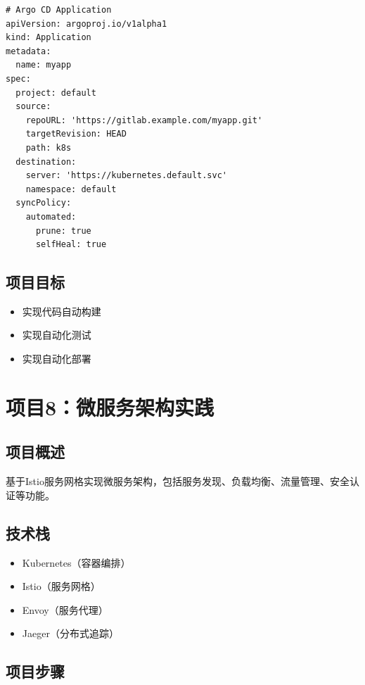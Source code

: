 \documentclass[12pt,UTF8]{ctexbook}
\begin{document}
\begin{lstlisting}
# Argo CD Application
apiVersion: argoproj.io/v1alpha1
kind: Application
metadata:
  name: myapp
spec:
  project: default
  source:
    repoURL: 'https://gitlab.example.com/myapp.git'
    targetRevision: HEAD
    path: k8s
  destination:
    server: 'https://kubernetes.default.svc'
    namespace: default
  syncPolicy:
    automated:
      prune: true
      selfHeal: true
\end{lstlisting}

\subsection*{项目目标}

\begin{itemize}
    \item 实现代码自动构建
    \item 实现自动化测试
    \item 实现自动化部署
\end{itemize}

\section{项目8：微服务架构实践}
\label{sec:project-microservices}

\subsection*{项目概述}

基于Istio服务网格实现微服务架构，包括服务发现、负载均衡、流量管理、安全认证等功能。

\subsection*{技术栈}

\begin{itemize}
    \item Kubernetes（容器编排）
    \item Istio（服务网格）
    \item Envoy（服务代理）
    \item Jaeger（分布式追踪）
\end{itemize}

\subsection*{项目步骤}
\end{document}
